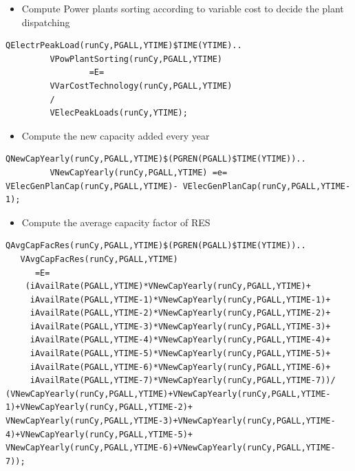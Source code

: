 \documentclass[a4paper,]{scrartcl}
\providecommand{\tightlist}{%
  \setlength{\itemsep}{0pt}\setlength{\parskip}{0pt}}
\begin{document}
\begin{itemize}
\tightlist
\item
  Compute Power plants sorting according to variable cost to decide the
  plant dispatching
\end{itemize}

\begin{lstlisting}
QElectrPeakLoad(runCy,PGALL,YTIME)$TIME(YTIME)..
         VPowPlantSorting(runCy,PGALL,YTIME)
                 =E=
         VVarCostTechnology(runCy,PGALL,YTIME)
         /
         VElecPeakLoads(runCy,YTIME);  
\end{lstlisting}

\begin{itemize}
\tightlist
\item
  Compute the new capacity added every year
\end{itemize}

\begin{lstlisting}
QNewCapYearly(runCy,PGALL,YTIME)$(PGREN(PGALL)$TIME(YTIME))..
         VNewCapYearly(runCy,PGALL,YTIME) =e=
VElecGenPlanCap(runCy,PGALL,YTIME)- VElecGenPlanCap(runCy,PGALL,YTIME-1);                       
\end{lstlisting}

\begin{itemize}
\tightlist
\item
  Compute the average capacity factor of RES
\end{itemize}

\begin{lstlisting}
QAvgCapFacRes(runCy,PGALL,YTIME)$(PGREN(PGALL)$TIME(YTIME))..
   VAvgCapFacRes(runCy,PGALL,YTIME)
      =E=
    (iAvailRate(PGALL,YTIME)*VNewCapYearly(runCy,PGALL,YTIME)+
     iAvailRate(PGALL,YTIME-1)*VNewCapYearly(runCy,PGALL,YTIME-1)+
     iAvailRate(PGALL,YTIME-2)*VNewCapYearly(runCy,PGALL,YTIME-2)+
     iAvailRate(PGALL,YTIME-3)*VNewCapYearly(runCy,PGALL,YTIME-3)+
     iAvailRate(PGALL,YTIME-4)*VNewCapYearly(runCy,PGALL,YTIME-4)+
     iAvailRate(PGALL,YTIME-5)*VNewCapYearly(runCy,PGALL,YTIME-5)+
     iAvailRate(PGALL,YTIME-6)*VNewCapYearly(runCy,PGALL,YTIME-6)+
     iAvailRate(PGALL,YTIME-7)*VNewCapYearly(runCy,PGALL,YTIME-7))/
(VNewCapYearly(runCy,PGALL,YTIME)+VNewCapYearly(runCy,PGALL,YTIME-1)+VNewCapYearly(runCy,PGALL,YTIME-2)+
VNewCapYearly(runCy,PGALL,YTIME-3)+VNewCapYearly(runCy,PGALL,YTIME-4)+VNewCapYearly(runCy,PGALL,YTIME-5)+
VNewCapYearly(runCy,PGALL,YTIME-6)+VNewCapYearly(runCy,PGALL,YTIME-7));
\end{lstlisting}
\end{document}
